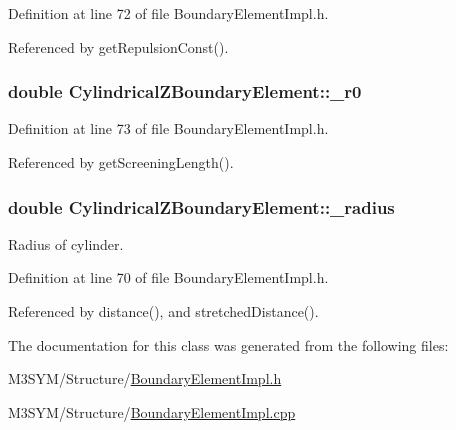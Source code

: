 Definition at line 72 of file Boundary\+Element\+Impl.\+h.



Referenced by get\+Repulsion\+Const().

\hypertarget{classCylindricalZBoundaryElement_a62b5ad9130b1cdeaa17ea3beaad760ef}{
\subsubsection[{\+\_\+r0}]{\setlength{\rightskip}{0pt plus 5cm}double Cylindrical\+Z\+Boundary\+Element\+::\+\_\+r0\hspace{0.3cm}{\ttfamily [private]}}}\label{classCylindricalZBoundaryElement_a62b5ad9130b1cdeaa17ea3beaad760ef}


Definition at line 73 of file Boundary\+Element\+Impl.\+h.



Referenced by get\+Screening\+Length().

\hypertarget{classCylindricalZBoundaryElement_a09b2855b82606ae98f56e70eca516873}{
\subsubsection[{\+\_\+radius}]{\setlength{\rightskip}{0pt plus 5cm}double Cylindrical\+Z\+Boundary\+Element\+::\+\_\+radius\hspace{0.3cm}{\ttfamily [private]}}}\label{classCylindricalZBoundaryElement_a09b2855b82606ae98f56e70eca516873}


Radius of cylinder. 



Definition at line 70 of file Boundary\+Element\+Impl.\+h.



Referenced by distance(), and stretched\+Distance().



The documentation for this class was generated from the following files\+:\begin{DoxyCompactItemize}
\item 
M3\+S\+Y\+M/\+Structure/\hyperlink{BoundaryElementImpl_8h}{Boundary\+Element\+Impl.\+h}\item 
M3\+S\+Y\+M/\+Structure/\hyperlink{BoundaryElementImpl_8cpp}{Boundary\+Element\+Impl.\+cpp}\end{DoxyCompactItemize}
